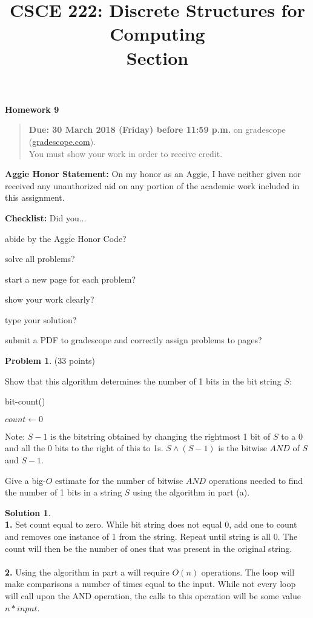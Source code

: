 \documentclass{article}
\title{CSCE 222: Discrete Structures for Computing\\Section \mysectionnumber\\\mysemester}
\author{\myname}
\date{}
\theoremstyle{definition}
\newtheorem{problem}{Problem}
\newtheorem*{solution}{Solution}
\newcommand{\honor}{\noindent \textbf{Aggie Honor Statement: }On my honor as an Aggie, I have neither
  given nor received any unauthorized aid on any portion of the academic work included in this assignment.
}
\newcommand{\checklist}{\noindent\textbf{Checklist:}
Did you...
\begin{compactenum}
\item abide by the Aggie Honor Code?
\item solve all problems?
\item start a new page for each problem?
\item show your work clearly?
\item type your solution?
\item submit a PDF to gradescope and correctly assign problems to pages?
\end{compactenum}
}
\newcommand{\problemset}[1]{\begin{center}\textbf{Homework #1}\end{center}}
\newcommand{\duedate}[1]{\begin{quote}\textbf{Due: #1} on gradescope (\url{gradescope.com}). \\You must show your work in order to receive credit.\end{quote}}
\newcommand{\homeworknumber}[0]{9}
\begin{document}
\maketitle
\problemset{\homeworknumber}
\duedate{30 March 2018 (Friday) before 11:59 p.m.}
\bigskip

\honor
\bigskip

\checklist

\begin{problem} (33 points)
\begin{compactenum}
\item Show that this algorithm determines the number of 1 bits in the bit string $S$:\\
\begin{procedure}[H]
\caption{bit-count()}
\DontPrintSemicolon
$count \gets 0$\;
\end{procedure}
Note: $S-1$ is the bitstring obtained by changing the rightmost 1 bit of $S$ to a 0 and all the 0 bits to the right of this to 1s.  $S \wedge (S-1)$ is the bitwise $AND$ of $S$ and $S-1$.
\item Give a big-$O$ estimate for the number of bitwise $AND$ operations needed to find the number of 1 bits in a string $S$ using the algorithm in part (a).
\end{compactenum}
\end{problem}

\begin{solution}\ \\

\textbf{1.} Set count equal to zero. While bit string does not equal 0, add one to count and removes one instance of 1 from the string. Repeat until string is all 0. The count will then be the number of ones that was present in the original string.\ \\
\ \\
\indent 
\textbf{2.} Using the algorithm in part a will require $O(n)$ operations. The loop will make comparisons a number of times equal to the input. While not every loop will call upon the AND operation, the calls to this operation will be some value $n*input$.
\end{solution}

\newpage
\end{document}

